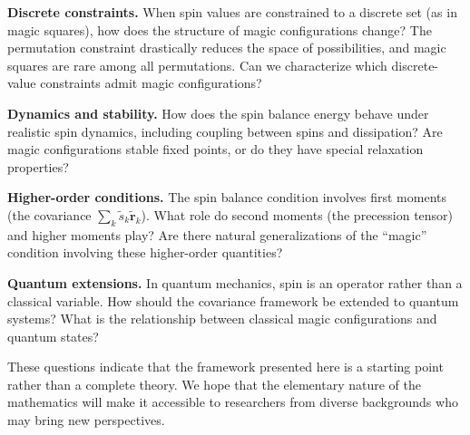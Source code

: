 \textbf{Discrete constraints.} When spin values are constrained to a discrete set (as in magic squares), how does the structure of magic configurations change? The permutation constraint drastically reduces the space of possibilities, and magic squares are rare among all permutations. Can we characterize which discrete-value constraints admit magic configurations?

\textbf{Dynamics and stability.} How does the spin balance energy behave under realistic spin dynamics, including coupling between spins and dissipation? Are magic configurations stable fixed points, or do they have special relaxation properties?

\textbf{Higher-order conditions.} The spin balance condition involves first moments (the covariance $\sum_k \tilde{s}_k \tilde{\mathbf{r}}_k$). What role do second moments (the precession tensor) and higher moments play? Are there natural generalizations of the ``magic'' condition involving these higher-order quantities?

\textbf{Quantum extensions.} In quantum mechanics, spin is an operator rather than a classical variable. How should the covariance framework be extended to quantum systems? What is the relationship between classical magic configurations and quantum states?

These questions indicate that the framework presented here is a starting point rather than a complete theory. We hope that the elementary nature of the mathematics will make it accessible to researchers from diverse backgrounds who may bring new perspectives.

